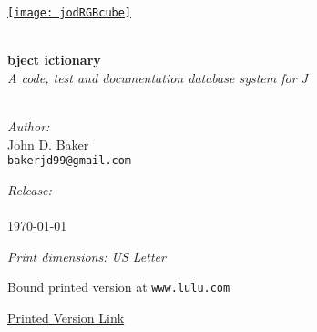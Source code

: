 \begin{titlepage}
 
\begin{center}
 
 
\href{http://bakerjd99.wordpress.com/the-jod-page/}{\texttt{[image: jodRGBcube]}} 
 
\HRule \\[0.8cm]

{ \Huge \bfseries {} bject ictionary}\\[0.4cm]

\textsl{A code, test and documentation database system for J}\\[0.4cm]
 
\HRule \\[0.8cm]
 
 
\begin{minipage}{0.4\textwidth}
\begin{flushleft}
\emph{Author:}\\
John D. Baker \\
\texttt{bakerjd99@gmail.com} \\
\end{flushleft}
\end{minipage}
\begin{minipage}{0.4\textwidth}
\begin{flushright}
\emph{Release:}\\
\jodversion \\
\today \\
\end{flushright}
\end{minipage}

\vspace{0.8cm}

\emph{Print dimensions: US Letter}

Bound printed version at \texttt{www.lulu.com}

\href{http://www.lulu.com/shop/john-baker/jod-j-object-dictionary/paperback/product-20076023.html}{Printed Version Link}


\end{center}
\end{titlepage}
